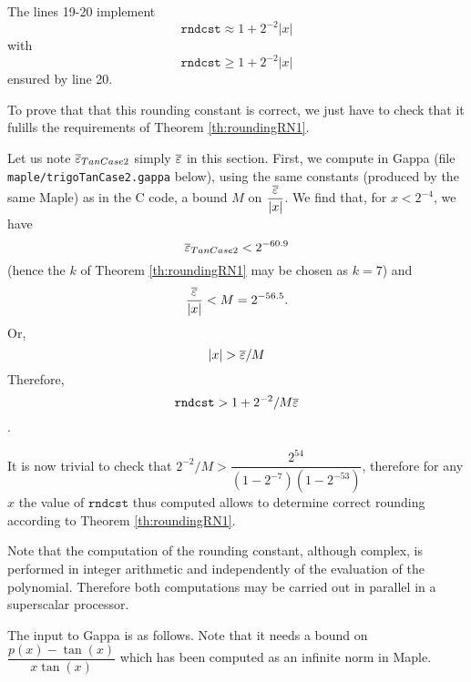 The lines 19-20 implement $$\mathtt{rndcst} \approx 1 + 2^{-2}|x|$$ 
with  
$$\mathtt{rndcst} \ge 1 + 2^{-2}|x|$$ ensured by line 20.

To prove that that this rounding constant is correct, we just have to
check that it fulills the requirements of Theorem \ref{th:roundingRN1}.

Let us note ${\overline{\varepsilon}}_{TanCase2}$ simply ${\overline{\varepsilon}}$ in this section.
First, we compute in Gappa (file\\ \texttt{maple/trigoTanCase2.gappa} below),
using the same constants (produced by the same Maple) as in the C
code, a bound $M$ on $\dfrac{{\overline{\varepsilon}}}{|x|}$. We find that, for
$x<2^{-4}$, we have 
$${\overline{\varepsilon}}_{TanCase2} < 2^{-60.9} $$
(hence the $k$ of Theorem \ref{th:roundingRN1} may be chosen as $k=7$) and
$$\dfrac{{\overline{\varepsilon}}}{|x|} < M=2^{-56.5} .$$
Or, $$|x| > {\overline{\varepsilon}}/M$$
Therefore, 
$$\mathtt{rndcst} > 1 + 2^{-2}/M{\overline{\varepsilon}}$$. 

It is now trivial to check that $2^{-2}/M >
\dfrac{2^{54}}{(1-2^{-7})(1-2^{-53})}$, therefore for any $x$
the value of $\mathtt{rndcst}$ thus computed allows to determine
correct rounding according to Theorem \ref{th:roundingRN1}. 

Note that the computation of the rounding constant, although complex, is performed in
integer arithmetic and independently of the evaluation of the polynomial.
Therefore both computations may be carried out in parallel in a superscalar processor.

The input to Gappa is as follows. Note that it needs a bound on
$\dfrac{p(x)-\tan(x)}{x \tan(x)}$ which has been computed as an infinite
norm in Maple.







